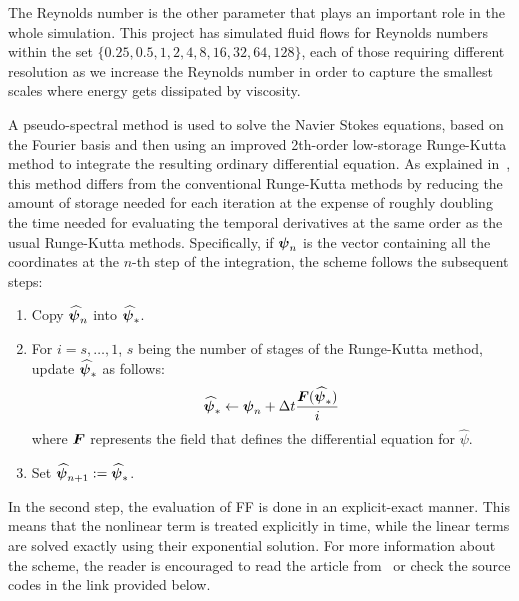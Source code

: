 \documentclass[../main.tex]{subfiles}
\begin{document}
The Reynolds number is the other parameter that plays an important role in the whole simulation. This project has simulated fluid flows for Reynolds numbers within the set $\{0.25, 0.5, 1, 2, 4, 8, 16, 32, 64, 128\}$, each of those requiring different resolution as we increase the Reynolds number in order to capture the smallest scales where energy gets dissipated by viscosity.

A pseudo-spectral method is used to solve the Navier Stokes equations, based on the Fourier basis and then using an improved 2th-order low-storage Runge-Kutta method to integrate the resulting ordinary differential equation. As explained in~\cite{rungekutta}, this method differs from the conventional Runge-Kutta methods by reducing the amount of storage needed for each iteration at the expense of roughly doubling the time needed for evaluating the temporal derivatives at the same order as the usual Runge-Kutta methods. Specifically, if $\boldsymbol{\psi}_n$ is the vector containing all the coordinates at the $n$-th step of the integration, the scheme follows the subsequent steps:
\begin{enumerate}
	\item Copy $\boldsymbol{\widehat\psi}_n$ into $\boldsymbol{\widehat\psi}_*$.
	\item For $i = s, \ldots, 1$, $s$ being the number of stages of the Runge-Kutta method, update $\boldsymbol{\widehat\psi}_*$ as follows:
	      \begin{equation}
		      \boldsymbol{\widehat\psi}_* \leftarrow \boldsymbol{\psi}_n + \Delta t \frac{\boldsymbol{F}(\boldsymbol{\widehat\psi}_*)}{i}
	      \end{equation}
	      where $\boldsymbol{F}$ represents the field that defines the differential equation for ${\widehat\psi}$.
	\item Set $\boldsymbol{\widehat\psi}_{n+1} := \boldsymbol{\widehat\psi}_*$.
\end{enumerate}
In the second step, the evaluation of FF is done in an explicit-exact manner. This means that the nonlinear term is treated explicitly in time, while the linear terms are solved exactly using their exponential solution. For more information about the scheme, the reader is encouraged to read the article from~\cite{rungekutta} or check the source codes in the link provided below.
\end{document}
